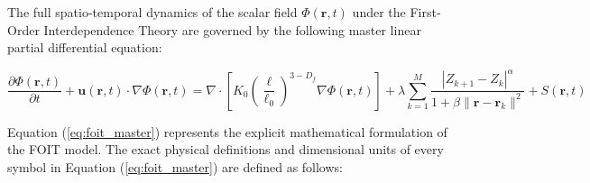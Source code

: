 \documentclass[11pt,a4paper]{article}
\begin{document}
The full spatio-temporal dynamics of the scalar field $\Phi(\mathbf{r}, t)$ under the First-Order Interdependence Theory are governed by the following master linear partial differential equation:

\begin{equation}
\frac{\partial \Phi(\mathbf{r}, t)}{\partial t} + \mathbf{u}(\mathbf{r}, t) \cdot \nabla \Phi(\mathbf{r}, t) = \nabla \cdot \left[ K_0 \left(\frac{\ell}{\ell_0}\right)^{3 - D_f} \nabla \Phi(\mathbf{r}, t) \right] + \lambda \sum_{k=1}^{M} \frac{|Z_{k+1} - Z_k|^\alpha}{1 + \beta \|\mathbf{r} - \mathbf{r}_k\|^2} + S(\mathbf{r}, t)
\label{eq:foit_master}
\end{equation}

\noindent Equation (\ref{eq:foit_master}) represents the explicit mathematical formulation of the FOIT model. The exact physical definitions and dimensional units of every symbol in Equation (\ref{eq:foit_master}) are defined as follows:
\end{document}
